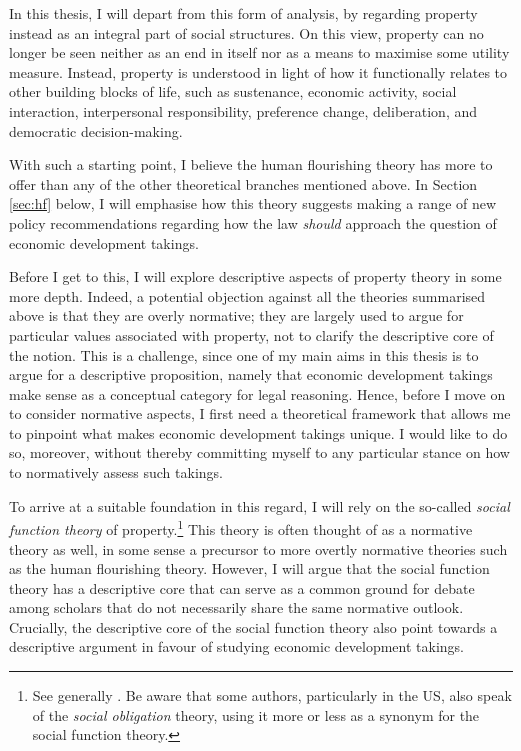 In this thesis, I will depart from this form of analysis, by regarding property instead as an integral part of social structures. On this view,  property can no longer be seen neither as an end in itself nor as a means to maximise some utility measure. Instead, property is understood in light of how it functionally relates to other building blocks of life, such as sustenance, economic activity, social interaction, interpersonal responsibility, preference change, deliberation,  and democratic decision-making.

With such a starting point, I believe the human flourishing theory has more to offer than any of the other theoretical branches mentioned above. In Section \ref{sec:hf} below, I will emphasise how this theory suggests making a range of new policy recommendations regarding how the law {\it should} approach the question of economic development takings.

Before I get to this, I will explore descriptive aspects of property theory in some more depth. Indeed, a potential objection against all the theories summarised above is that they are overly normative; they are largely used to argue for particular values associated with property, not to clarify the descriptive core of the notion. This is a challenge, since one of my main aims in this thesis is to argue for a descriptive proposition, namely that economic development takings make sense as a conceptual category for legal reasoning. Hence, before I move on to consider normative aspects, I first need a theoretical framework that allows me to pinpoint what makes economic development takings unique. I would like to do so, moreover, without thereby committing myself to any particular stance on how to normatively assess such takings.

To arrive at a suitable foundation in this regard, I will rely on the so-called {\it social function theory} of property.\footnote{See generally \cite{foster11,mirow10,alexander09a}. Be aware that some authors, particularly in the US, also speak of the {\it social obligation} theory, using it more or less as a synonym for the social function theory.} This theory is often thought of as a normative theory as well, in some sense a precursor to more overtly normative theories such as the human flourishing theory. However, I will argue that the social function theory has a descriptive core that can serve as a common ground for debate among scholars that do not necessarily share the same normative outlook. Crucially, the descriptive core of the social function theory also point towards a descriptive argument in favour of studying economic development takings.
